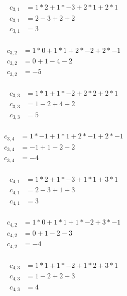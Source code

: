 \documentclass[12pt]{article}
\begin{document}
\begin{itemize}
\begin{align*}
    c_{3,1} &= 1 * 2 + 1 * -3 + 2 * 1 + 2 * 1 \\
    c_{3,1} &= 2 - 3 + 2 + 2 \\
    c_{3,1} &= 3  \\
\end{align*}

\begin{align*}
    c_{3,2} &= 1 * 0 + 1 * 1 + 2 * -2 + 2 * -1 \\
    c_{3,2} &= 0 + 1 - 4 - 2 \\
    c_{3,2} &= -5  \\
\end{align*}

\begin{align*}
    c_{3,3} &= 1 * 1 + 1 * -2 + 2 * 2 + 2 * 1 \\
    c_{3,3} &= 1 - 2 + 4 + 2 \\
    c_{3,3} &= 5  \\
\end{align*}

\begin{align*}
    c_{3,4} &= 1 * -1 + 1 * 1 + 2 * -1 + 2 * -1 \\
    c_{3,4} &= -1 + 1 - 2 - 2 \\
    c_{3,4} &= -4  \\
\end{align*}

\begin{align*}
    c_{4,1} &= 1 * 2 + 1 * -3 + 1 * 1 + 3 * 1 \\
    c_{4,1} &= 2 - 3 + 1 + 3 \\
    c_{4,1} &= 3  \\
\end{align*}

\begin{align*}
    c_{4,2} &= 1 * 0 + 1 * 1 + 1 * -2 + 3 * -1 \\
    c_{4,2} &= 0 + 1 - 2 - 3 \\
    c_{4,2} &= -4  \\
\end{align*}

\begin{align*}
    c_{4,3} &= 1 * 1 + 1 * -2 + 1 * 2 + 3 * 1 \\
    c_{4,3} &= 1 - 2 + 2 + 3 \\
    c_{4,3} &= 4  \\
\end{align*}


\end{itemize}
\end{document}
